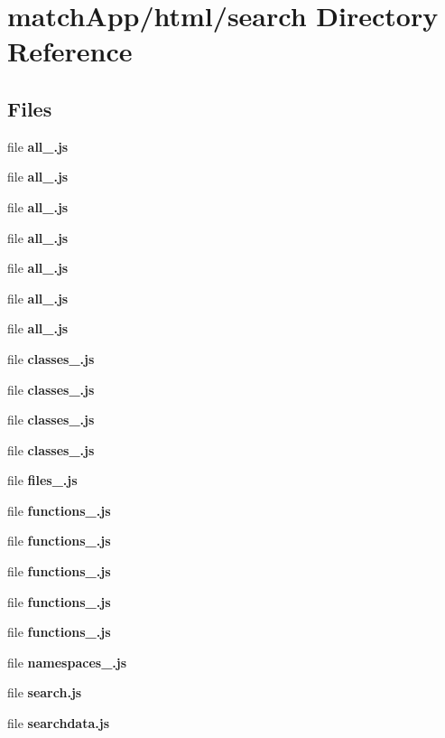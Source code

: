 \section{match\+App/html/search Directory Reference}
\label{dir_deb22b43b511757e51f0711b2f5e8104}
\subsection*{Files}
\begin{DoxyCompactItemize}
\item 
file {\bf all\+\_.\+js}
\item 
file {\bf all\+\_.\+js}
\item 
file {\bf all\+\_.\+js}
\item 
file {\bf all\+\_.\+js}
\item 
file {\bf all\+\_.\+js}
\item 
file {\bf all\+\_.\+js}
\item 
file {\bf all\+\_.\+js}
\item 
file {\bf classes\+\_.\+js}
\item 
file {\bf classes\+\_.\+js}
\item 
file {\bf classes\+\_.\+js}
\item 
file {\bf classes\+\_.\+js}
\item 
file {\bf files\+\_.\+js}
\item 
file {\bf functions\+\_.\+js}
\item 
file {\bf functions\+\_.\+js}
\item 
file {\bf functions\+\_.\+js}
\item 
file {\bf functions\+\_.\+js}
\item 
file {\bf functions\+\_.\+js}
\item 
file {\bf namespaces\+\_.\+js}
\item 
file {\bf search.\+js}
\item 
file {\bf searchdata.\+js}
\end{DoxyCompactItemize}
